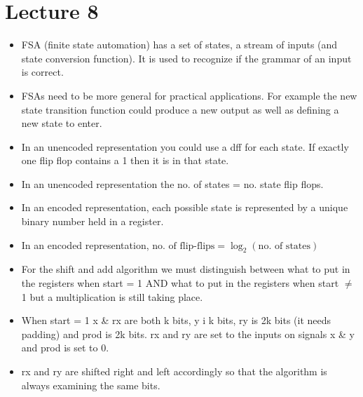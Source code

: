 \documentclass{article}
\begin{document}
\section*{Lecture 8}
\begin{itemize}
\item FSA (finite state automation) has a set of states, a stream of inputs (and state conversion function). It is used to recognize if the grammar of an input is correct.
\item FSAs need to be more general for practical applications. For example the new state transition function could produce a new output as well as defining a new state to enter.
\item In an unencoded representation you could use a dff for each state. If exactly one flip flop contains a 1 then it is in that state.
\item In an unencoded representation the no. of states = no. state flip flops.
\item In an encoded representation, each possible state is represented by a unique binary number held in a register.
\item In an encoded representation, $\text{no. of flip-flips} = \log_{2}(\text{no. of states})$
\item For the shift and add algorithm we must distinguish between what to put in the registers when start = 1 AND what to put in the registers when start $\neq$ 1 but a multiplication is still taking place.
\item When start = 1 x \& rx are both k bits, y i k bits, ry is 2k bits (it needs padding) and prod is 2k bits. rx and ry are set to the inputs on signals x \& y and prod is set to 0.
\item rx and ry are shifted right and left accordingly so that the algorithm is always examining the same bits.

\end{itemize}
\end{document}
